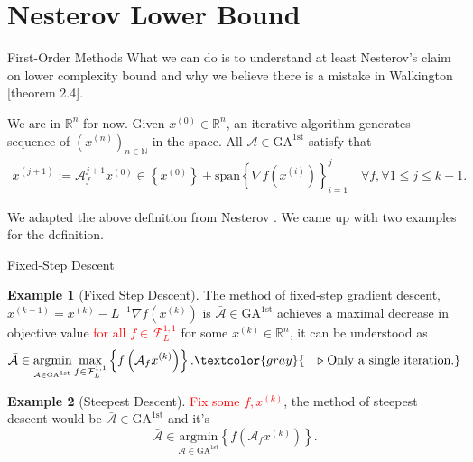 \documentclass[11pt]{beamer}
\theoremstyle{definition}
\newtheorem{exmp}{Example}[section]
\begin{document}
\section{Nesterov Lower Bound}
\newcommand*{\GAfirst}{\text{GA}^{\text{1st}}}
    \begin{frame}{First-Order Methods}
        What we can do is to understand at least Nesterov's claim on lower complexity bound and why we believe there is a mistake in Walkington [theorem 2.4]\cite{noel_nesterovs_nodate}. 
        \begin{definition}
            We are in $\mathbb R^n$ for now. Given $x^{(0)} \in \mathbb R^n$, an iterative algorithm generates sequence of $\left(x^{(n)}\right)_{n \in \mathbb N}$ in the space. All $\mathcal A \in \GAfirst$ satisfy that 
            \begin{align*}
                 x^{(j + 1)}:= \mathcal A_f^{j + 1}x^{(0)} \in \left\{x^{(0)}\right\} + 
                \text{span}\left\{\nabla f\left(x^{(i)}\right)\right\}_{i = 1}^{j} \quad \forall f, \forall 1\le j \le k -1. 
            \end{align*}
        \end{definition}
        We adapted the above definition from Nesterov \cite[2.1.4]{nesterov_lecture_2018}. 
        We came up with two examples for the definition. 
    \end{frame}  
    \begin{frame}{Fixed-Step Descent}
        \begin{exmp}[Fixed Step Descent]
            The method of fixed-step gradient descent, $x^{(k + 1)} = x^{(k)} - L^{-1}\nabla f(x^{(k)})$ is $ \bar {\mathcal A}\in \GAfirst$ achieves a maximal decrease in objective value \textcolor{red}{for all $f\in \mathcal F_{L}^{1, 1}$} for some $x^{(k)}\in \mathbb R^n$, it can be understood as 
            \[
                \bar {\mathcal A} \in 
                \underset{_{\mathcal A\in \GAfirst}}{\text{argmin}}
                \max_{f\in \mathcal F_L^{1, 1}} \left\lbrace
                    f\left(
                        \mathcal A_f x^{(k)}
                    \right)
                \right\rbrace. \textcolor{gray}{\quad\triangleright\; \text{Only a single iteration.}}
            \]
        \end{exmp}
        \begin{exmp}[Steepest Descent]
            \textcolor{red}{Fix some $f, x^{(k)}$}, the method of steepest descent would be $\bar {\mathcal A}\in \GAfirst$ and it's 
            \[
                \bar {\mathcal A}\in  \underset{\mathcal A \in \GAfirst}{\text{argmin}}
                \left\lbrace
                    f\left(
                        \mathcal A_f x^{(k)}
                    \right)
                \right\rbrace. 
            \]
        \end{exmp}
    \end{frame}
    
\end{document}
